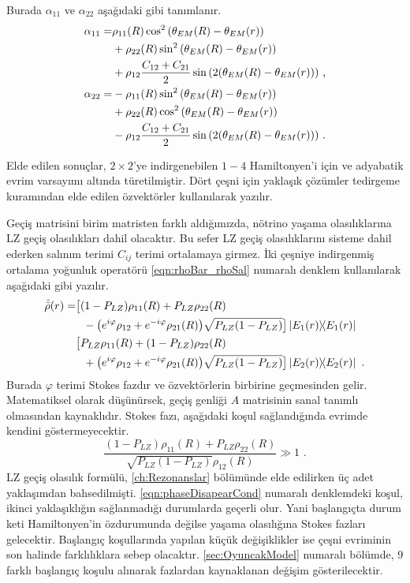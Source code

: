 Burada $ \alpha_{11} $ ve $ \alpha_{22} $ aşağıdaki gibi tanımlanır.
\begin{align}
    \nonumber \alpha_{11} =& \rho_{11}(R)\cos^{2}\qty(\theta_{EM}(R) - \theta_{EM}(r)) \\
    \nonumber             &+ \rho_{22}(R)\sin^{2}\qty(\theta_{EM}(R) - \theta_{EM}(r)) \\
                &+ \rho_{12}\frac{C_{12}+C_{21}}{2}\sin\qty(2\qty(\theta_{EM}(R) - \theta_{EM}(r))) \text{ ,}\\
    \nonumber \alpha_{22} =&-\rho_{11}(R)\sin^{2}\qty(\theta_{EM}(R) - \theta_{EM}(r)) \\
    \nonumber &+ \rho_{22}(R)\cos^{2}\qty(\theta_{EM}(R) - \theta_{EM}(r)) \\
                &- \rho_{12}\frac{C_{12}+C_{21}}{2}\sin\qty(2\qty(\theta_{EM}(R) - \theta_{EM}(r))) \text{ .}
\end{align}

Elde edilen sonuçlar, $ 2\times2 $'ye indirgenebilen $ 1-4 $ Hamiltonyen'i için ve adyabatik evrim varsayımı altında türetilmiştir. Dört çeşni için yaklaşık çözümler tedirgeme kuramından elde edilen özvektörler kullanılarak yazılır.

Geçiş matrisini birim matristen farklı aldığımızda, nötrino yaşama olasılıklarına LZ geçiş olasılıkları dahil olacaktır. Bu sefer LZ geçiş olasılıklarını sisteme dahil ederken salınım terimi $ C_{ij} $ terimi ortalamaya girmez. İki çeşniye indirgenmiş ortalama yoğunluk operatörü \eqref{eqn:rhoBar_rhoSal} numaralı denklem kullanılarak aşağıdaki gibi yazılır.
\begin{align}
    \nonumber \hat{\bar{\rho}}(r) =& \big[(1-P_{LZ})\rho_{11}(R)+P_{LZ}\rho_{22}(R) \\
    \nonumber & ~~ -\qty(e^{i\varphi}\rho_{12}+e^{-i\varphi}\rho_{21}(R)) \sqrt{P_{LZ}(1-P_{LZ})}\big] \dyad{E_{1}(r)}{E_{1}(r)} \\
    \nonumber & \big[P_{LZ}\rho_{11}(R)+(1-P_{LZ})\rho_{22}(R) \\
    & ~~ +\qty(e^{i\varphi}\rho_{12}+e^{-i\varphi}\rho_{21}(R)) \sqrt{P_{LZ}(1-P_{LZ})}\big] \dyad{E_{2}(r)}{E_{2}(r)} \text{ .}
\end{align}
Burada $ \varphi $ terimi Stokes fazdır ve özvektörlerin birbirine geçmesinden gelir. Matematiksel olarak düşünürsek, geçiş genliği $ A $ matrisinin sanal tanımlı olmasından kaynaklıdır. Stokes fazı, aşağıdaki koşul sağlandığında evrimde kendini göstermeyecektir.
\begin{equation}\label{eqn:phaseDisapearCond}
    \frac{(1-P_{LZ}) \rho_{11}(R) + P_{LZ} \rho_{22}(R)}{\sqrt{P_{LZ}(1-P_{LZ})}\rho_{12}(R)} \gg 1 \text{ .}
\end{equation}
LZ geçiş olasılık formülü, \ref{ch:Rezonanslar} bölümünde elde edilirken üç adet yaklaşımdan bahsedilmişti. \eqref{eqn:phaseDisapearCond} numaralı denklemdeki koşul, ikinci yaklaşıklığın sağlanmadığı durumlarda geçerli olur. Yani başlangıçta durum keti Hamiltonyen'in özdurumunda değilse yaşama olasılığına Stokes fazları gelecektir. Başlangıç koşullarında yapılan küçük değişiklikler ise çeşni evriminin son halinde farklılıklara sebep olacaktır. \ref{sec:OyuncakModel} numaralı bölümde, 9 farklı başlangıç koşulu alınarak fazlardan kaynaklanan değişim gösterilecektir.

